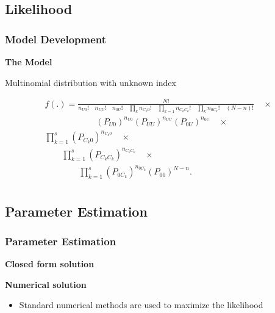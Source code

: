 \documentclass{beamer}
\begin{document}
\subsection{Likelihood}
\begin{frame} \frametitle{Model Development}
\textbf{{\footnotesize The  Model}}
\vspace{6pt}

{\footnotesize Multinomial distribution with unknown index }
\vspace{6pt}

{\tiny 
 \begin{multline*}
f(.) = \frac{N!}{n_{U0}!\quad n_{UU}!\quad n_{0U}! \quad \prod\limits_{k} n_{C_{k}0}! \quad  \prod\limits_{k=1}n_{C_{k}C_{k}}! \quad \prod\limits_{k} n_{0C_{k}}! \quad (N-n)!} \quad \times \\
\qquad \qquad \qquad (P_{U0})^{n_{U0}}(P_{UU})^{n_{UU}}(P_{0U})^{n_{0U}} \quad \times \\
\prod\limits_{k=1}^{s} (P_{C_{k}0})^{n_{C_{k}0}} \quad \times \\
\qquad \prod\limits_{k=1}^{s} (P_{C_{k}C_{k}})^{n_{ C_{k}C_{k}}} \quad \times \\
\qquad \qquad \prod\limits_{k=1}^{s} (P_{0C_{k}})^{n_{0C_{k}}}(P_{00})^{N-n}  .\\
 \end{multline*}
  }
\end{frame}
\subsection{Parameter Estimation}
\begin{frame} \frametitle{Parameter Estimation}

\textbf{{\small Closed form solution}}

%

\vspace{24pt}
\textbf{{\small Numerical  solution}}
\begin{itemize}
\item Standard numerical methods are used to maximize the likelihood 
\end{itemize}

\end{frame}
\end{document}
